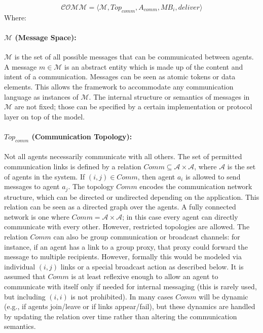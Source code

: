 \[
\mathcal{COMM} = \langle \mathcal{M}, Top_{comm}, A_{comm}, MB_i, deliver\rangle
\]
Where:

\paragraph{$\mathcal{M}$ (Message Space):} $\mathcal{M}$ is the set of all possible messages that can be communicated between agents. A message $m \in \mathcal{M}$ is an abstract entity which is made up of the content and intent of a communication. Messages can be seen as atomic tokens or data elements. This allows the framework to accommodate any communication language as instances of $\mathcal{M}$. The internal structure or semantics of messages in $\mathcal{M}$ are not fixed; those can be specified by a certain implementation or protocol layer on top of the model.

\paragraph{$Top_{comm}$ (Communication Topology):} Not all agents necessarily communicate with all others. The set of permitted communication links is defined by a relation $Comm \subseteq \mathcal{A} \times \mathcal{A}$, where $\mathcal{A}$ is the set of agents in the system. If $(i,j) \in Comm$, then agent $a_i$ is allowed to send messages to agent $a_j$. The topology $Comm$ encodes the communication network structure, which can be directed or undirected depending on the application. This relation can be seen as a directed graph over the agents. A fully connected network is one where $Comm = \mathcal{A} \times \mathcal{A}$; in this case every agent can directly communicate with every other. However, restricted topologies are allowed. The relation $Comm$ can also be group communication or broadcast channels: for instance, if an agent has a link to a group proxy, that proxy could forward the message to multiple recipients. However, formally this would be modeled via individual $(i,j)$ links or a special broadcast action as described below. It is assumed that $Comm$ is at least reflexive enough to allow an agent to communicate with itself only if needed for internal messaging (this is rarely used, but including $(i,i)$ is not prohibited). In many cases $Comm$ will be dynamic (e.g., if agents join/leave or if links appear/fail), but these dynamics are handled by updating the relation over time rather than altering the communication semantics.


